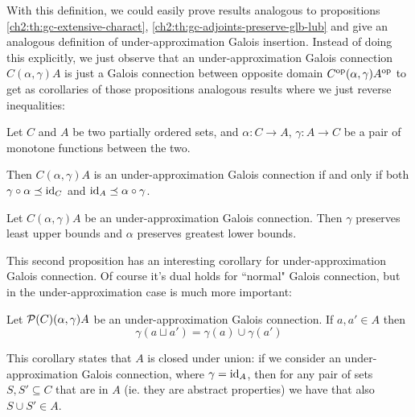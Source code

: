 With this definition, we could easily prove results analogous to propositions \ref{ch2:th:gc-extensive-charact}, \ref{ch2:th:gc-adjoints-preserve-glb-lub} and give an analogous definition of under-approximation Galois insertion.
Instead of doing this explicitly, we just observe that an under-approximation Galois connection $C (\alpha, \gamma) A$ is just a Galois connection between opposite domain $C^{\text{op}} (\alpha, \gamma) A^{\text{op}}$ to get as corollaries of those propositions analogous results where we just reverse inequalities:
\begin{prop}\label{ch2:th:under-gc-extensive-charact}
	Let $C$ and $A$ be two partially ordered sets, and $\alpha : C \rightarrow A$, $\gamma : A \rightarrow C$ be a pair of monotone functions between the two.
	
	Then $C (\alpha, \gamma) A$ is an under-approximation Galois connection if and only if both $\gamma \circ \alpha \preceq \text{id}_C$ and $\text{id}_A \preceq \alpha \circ \gamma$.
\end{prop}

\begin{prop}\label{ch2:th:under-gc-adjoints-preserve-lub-glb}
	Let $C (\alpha, \gamma) A$ be an under-approximation Galois connection. Then $\gamma$ preserves least upper bounds and $\alpha$ preserves greatest lower bounds.
\end{prop}

This second proposition has an interesting corollary for under-approximation Galois connection. Of course it's dual holds for ``normal" Galois connection, but in the under-approximation case is much more important:
\begin{corollary}\label{ch2:th:under-gc-union-closure}
	Let $\mathcal{P}(C) (\alpha, \gamma) A$ be an under-approximation Galois connection. If $a, a' \in A$ then
	\[
	\gamma(a \sqcup a') = \gamma(a) \cup \gamma(a')
	\]
\end{corollary}

This corollary states that $A$ is closed under union: if we consider an under-approximation Galois connection, where $\gamma = \text{id}_A$, then for any pair of sets $S, S' \subseteq C$ that are in $A$ (ie. they are abstract properties) we have that also $S \cup S' \in A$.

